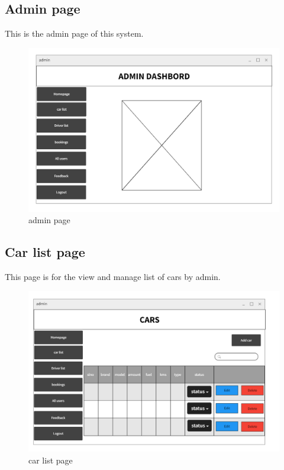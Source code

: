 \documentclass[a4paper,12pt,toc=flat]{report}
\begin{document}
	\pagebreak
	
		\subsection{Admin page}
\hspace*{12pt}
	This is the admin page  of this system.
	\begin{figure}[bph]
	\begin{center}
		\includegraphics[width=1.1 \linewidth, height=0.7\textheight]{"admin.png"}
	\end{center}
		\caption{admin page}
	\end{figure}

	\pagebreak
	
		\subsection{Car list page}
\hspace*{12pt}
	This page is for the view and manage list of cars by admin.
	\begin{figure}[bph]
	\begin{center}
	\includegraphics[width=1.1 \linewidth, height=0.7\textheight]{"admin_carlist.png"}
	\end{center}
		\caption{car list page}
	\end{figure}
\end{document}
